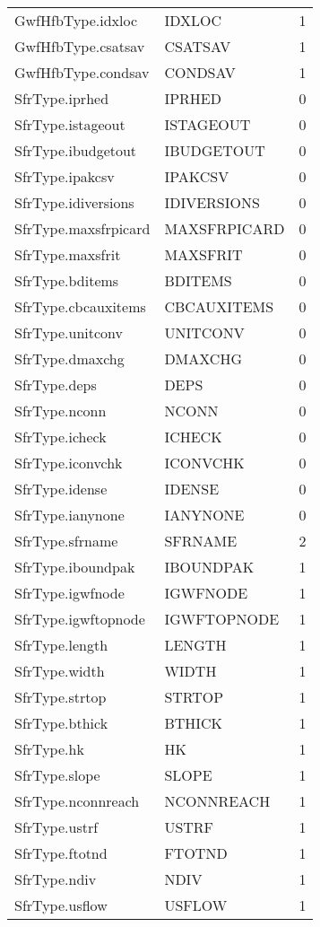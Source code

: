 \begin{longtable}{p{6cm} p{4cm} p{2cm} }
GwfHfbType.idxloc &  IDXLOC & 1 \\ 
GwfHfbType.csatsav &  CSATSAV & 1 \\ 
GwfHfbType.condsav &  CONDSAV & 1 \\ 
SfrType.iprhed &  IPRHED & 0 \\ 
SfrType.istageout &  ISTAGEOUT & 0 \\ 
SfrType.ibudgetout &  IBUDGETOUT & 0 \\ 
SfrType.ipakcsv &  IPAKCSV & 0 \\ 
SfrType.idiversions &  IDIVERSIONS & 0 \\ 
SfrType.maxsfrpicard &  MAXSFRPICARD & 0 \\ 
SfrType.maxsfrit &  MAXSFRIT & 0 \\ 
SfrType.bditems &  BDITEMS & 0 \\ 
SfrType.cbcauxitems &  CBCAUXITEMS & 0 \\ 
SfrType.unitconv &  UNITCONV & 0 \\ 
SfrType.dmaxchg &  DMAXCHG & 0 \\ 
SfrType.deps &  DEPS & 0 \\ 
SfrType.nconn &  NCONN & 0 \\ 
SfrType.icheck &  ICHECK & 0 \\ 
SfrType.iconvchk &  ICONVCHK & 0 \\ 
SfrType.idense &  IDENSE & 0 \\ 
SfrType.ianynone &  IANYNONE & 0 \\ 
SfrType.sfrname & SFRNAME & 2 \\ 
SfrType.iboundpak &  IBOUNDPAK & 1 \\ 
SfrType.igwfnode &  IGWFNODE & 1 \\ 
SfrType.igwftopnode &  IGWFTOPNODE & 1 \\ 
SfrType.length &  LENGTH & 1 \\ 
SfrType.width &  WIDTH & 1 \\ 
SfrType.strtop &  STRTOP & 1 \\ 
SfrType.bthick &  BTHICK & 1 \\ 
SfrType.hk &  HK & 1 \\ 
SfrType.slope &  SLOPE & 1 \\ 
SfrType.nconnreach &  NCONNREACH & 1 \\ 
SfrType.ustrf &  USTRF & 1 \\ 
SfrType.ftotnd &  FTOTND & 1 \\ 
SfrType.ndiv &  NDIV & 1 \\ 
SfrType.usflow &  USFLOW & 1 \\ 

\end{longtable}
